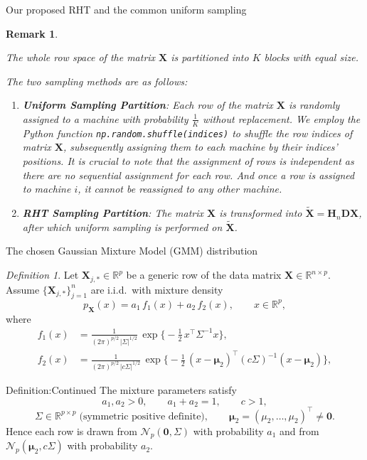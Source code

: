 \documentclass{beamer}
\newtheorem{remark}{Remark}
\theoremstyle{remark}
\newtheorem{defin}{Definition}
\begin{document}
\begin{frame}{Our proposed RHT and the common uniform sampling}
\begin{remark}
\label{remark:sampling}

The whole row space of the matrix $\mathbf{X}$ is partitioned into $K$ blocks with equal size.

The two sampling methods are as follows:

\begin{enumerate}
  \item \textbf{Uniform Sampling Partition}:
  Each row of the matrix $\mathbf{X}$ is randomly assigned to a machine with probability $\frac{1}{K}$ without replacement.
  We employ the Python function \texttt{np.random.shuffle(indices)} to shuffle the row indices of matrix $\mathbf{X}$, subsequently assigning them to each machine by their indices' positions.
  It is crucial to note that the assignment of rows is independent as there are no sequential assignment for each row. And once a row is assigned to machine $i$, it cannot be reassigned to any other machine.
  
  \item \textbf{RHT Sampling Partition}:
  The matrix $\mathbf{X}$ is transformed into $\mathbf{\tilde{X}} = \mathbf{H}_n\mathbf{D}\mathbf{X}$, after which uniform sampling is performed on $\mathbf{\tilde{X}}$.
\end{enumerate}
\end{remark}
\end{frame}
\begin{frame}{The chosen Gaussian Mixture Model (GMM) distribution}
\begin{defin}
  \label{def:gmm}
  Let $\mathbf{X}_{j,\ast}\in\mathbb R^{p}$ be a generic row of the data matrix $\mathbf X\in\mathbb R^{n\times p}$.
  Assume $\{\mathbf{X}_{j,\ast}\}_{j=1}^{n}$ are i.i.d.\ with mixture density
  \[
  p_{\mathbf{X}}(x)=a_{1}\,f_{1}(x)+a_{2}\,f_{2}(x), \qquad x\in\mathbb R^{p},
  \]
  where
  \begingroup\small
  \[
  \begin{aligned}
  f_{1}(x) &=
    \frac{1}{(2\pi)^{p/2}\,|\Sigma|^{1/2}}\,
    \exp\!\bigl\{-\tfrac12\,x^{\top}\Sigma^{-1}x\bigr\},\\[4pt]
  f_{2}(x) &=
    \frac{1}{(2\pi)^{p/2}\,|c\Sigma|^{1/2}}\,
    \exp\!\bigl\{-\tfrac12\,(x-\boldsymbol\mu_{2})^{\!\top}(c\Sigma)^{-1}(x-\boldsymbol\mu_{2})\bigr\},
  \end{aligned}
  \]
  \endgroup
  \smallskip
  \noindent
  \end{defin}
\end{frame}
\begin{frame}{Definition:Continued}
  The mixture parameters satisfy
  \begingroup\small
  \[
  a_{1},a_{2}>0,\qquad a_{1}+a_{2}=1,\qquad c>1,
  \]
  \[
  \Sigma\in\mathbb R^{p\times p}\;\text{(symmetric positive definite)},\qquad
  \boldsymbol\mu_{2}=(\mu_{2},\ldots,\mu_{2})^{\!\top}\neq\boldsymbol 0.
  \]
  \endgroup
  Hence each row is drawn from $\mathcal N_{p}(\boldsymbol 0,\Sigma)$ with probability $a_{1}$ and from
  $\mathcal N_{p}(\boldsymbol\mu_{2},c\Sigma)$ with probability $a_{2}$.
\end{frame}
\end{document}
